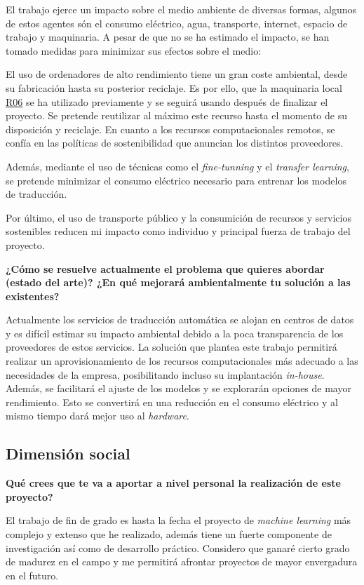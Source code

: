 El trabajo ejerce un impacto sobre el medio ambiente de diversas formas, algunos de estos
agentes són el consumo eléctrico, agua, transporte, internet, espacio de trabajo y maquinaria.
A pesar de que no se ha estimado el impacto, se han tomado medidas para minimizar
sus efectos sobre el medio:

El uso de ordenadores de alto rendimiento tiene un gran coste ambiental,
desde su fabricación hasta su posterior reciclaje. Es por ello, que la maquinaria
local \hyperref[R06]{R06} se ha utilizado previamente y se seguirá usando después de
finalizar el proyecto. Se pretende reutilizar al máximo este recurso hasta el
momento de su disposición y reciclaje.
En cuanto a los recursos computacionales remotos, se confía en las políticas de sostenibilidad
\cite{awssustainability} que anuncian los distintos proveedores.

Además, mediante el uso de técnicas como el \textit{fine-tunning} y el
\textit{transfer learning}, se pretende minimizar el consumo eléctrico necesario para
entrenar los modelos de traducción.

Por último, el uso de transporte público y la consumición de recursos y servicios sostenibles
reducen mi impacto como individuo y principal fuerza de trabajo del proyecto. 

\textbf{¿Cómo se resuelve actualmente el problema que quieres abordar (estado del arte)?
¿En qué mejorará ambientalmente tu solución a las existentes?}

Actualmente los servicios de traducción automática se alojan en centros de datos y
es difícil estimar su impacto ambiental debido a la poca transparencia de los proveedores
de estos servicios. La solución que plantea este trabajo permitirá realizar un aprovisionamiento
de los recursos computacionales más adecuado a las necesidades de la empresa, posibilitando incluso
su implantación \textit{in-house}. Además, se facilitará el ajuste de los modelos y se
explorarán opciones de mayor rendimiento.
Esto se convertirá en una reducción en el consumo eléctrico y al mismo tiempo dará mejor uso al
\textit{hardware}.


\subsection{Dimensión social}
\textbf{Qué crees que te va a aportar a nivel personal la realización de este proyecto?}

El trabajo de fin de grado es hasta la fecha el proyecto de \textit{machine learning} más
complejo y extenso que he realizado, además tiene un fuerte componente de investigación
así como de desarrollo práctico. Considero que ganaré cierto grado de madurez
en el campo y me permitirá afrontar proyectos de mayor envergadura en el futuro.

